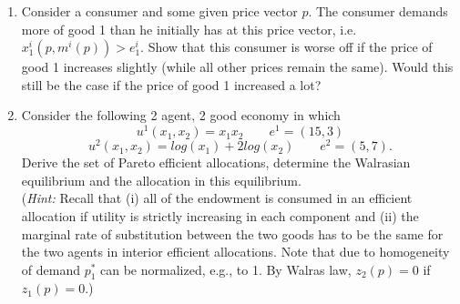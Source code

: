 \documentclass[a4paper,12pt]{article}
\begin{document}
\begin{enumerate}[resume]
\item Consider a consumer and some given price vector $p$. The consumer demands more of good 1 than he initially has at this price vector, i.e. $x^i_1(p,m^i(p))>e^i_1$. Show that this consumer is worse off if the price of good 1 increases slightly (while all other prices remain the same). Would this still be the case if the price of good 1 increased a lot?
\item Consider the following 2 agent, 2 good economy in which
  $$u^1(x_1,x_2)=x_1x_2 \qquad  e^1=(15,3)$$
  $$u^2(x_1,x_2)= log(x_1)+2 log(x_2) \qquad  e^2=(5,7).$$
  Derive the set of Pareto efficient allocations, determine the Walrasian equilibrium and the allocation in this equilibrium.\\
  (\emph{Hint:} Recall that (i) all of the endowment is consumed in an efficient allocation if utility is strictly increasing in each component and (ii) the marginal rate of substitution between the two goods has to be the same for the two agents in interior efficient allocations. Note that due to homogeneity of demand $p_1^*$ can be normalized, e.g., to 1. By Walras law, $z_2(p)=0$ if $z_1(p)=0$.)
\end{enumerate}
\end{document}
